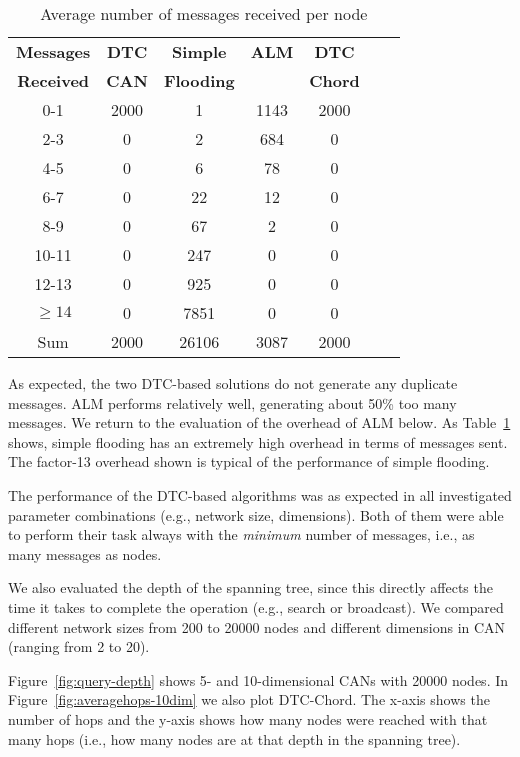 \documentclass[fleqn,12pt,twoside]{article}
\begin{document}
\begin{table}[!tb]
  \centering
  \begin{tabular}{|c|c|c|c|c|c|c|}
    \hline
    \textbf{Messages} & \textbf{DTC} & \textbf{Simple}   & \textbf{ALM}
    & \textbf{DTC}\\ 
    \textbf{Received} &	\textbf{CAN} & \textbf{Flooding} & &
    \textbf{Chord} \\ 
    \hline			
    0-1 &    2000 & 1 &    1143 &    2000 \\
    2-3 &   					0		&					2				&	684		&0\\
    4-5	&							0		&					6	  		&	78		&0 \\ 
    6-7	&							0		&					22				&	12		&0\\ 
    8-9	&							0		&					67			&	2			&0\\
    10-11&							0		&					247			&	0			&0\\
    12-13&							0		&					925			&	0			&0\\
    $\ge14$&						0		&					7851		&	0			&0\\
    \hline
    Sum& 2000 &	26106 & 3087 & 2000 \\
    \hline						
  \end{tabular}
  \caption{Average number of messages received per node}
  \label{tab:HopCountsForMulticastInCAN}
  \vskip -5mm
\end{table}


As expected, the two DTC-based solutions do not generate any duplicate
messages. ALM performs relatively well, generating about 50\% too many
messages.  We return to the evaluation of the overhead of ALM below.
As Table~\ref{tab:HopCountsForMulticastInCAN} shows, simple flooding
has an extremely high overhead in terms of messages sent. The
factor-13 overhead shown is typical of the performance of simple
flooding.

The performance of the DTC-based algorithms was as expected in all
investigated parameter combinations (e.g., network size, dimensions).
Both of them were able to perform their task always with the
\emph{minimum} number of messages, i.e., as many messages as nodes.

We also evaluated the depth of the spanning tree, since this directly
affects the time it takes to complete the operation (e.g., search or
broadcast). We compared different network sizes from 200 to 20000
nodes and different dimensions in CAN (ranging from 2 to 20).

Figure~\ref{fig:query-depth} shows 5- and 10-dimensional CANs with
20000 nodes. In Figure~\ref{fig:averagehops-10dim} we also plot
DTC-Chord. The x-axis shows the number of hops and the y-axis shows
how many nodes were reached with that many hops (i.e., how many nodes
are at that depth in the spanning tree).
\end{document}
